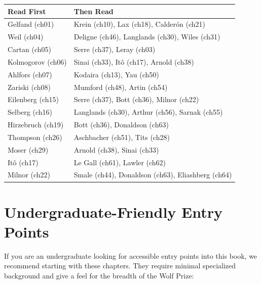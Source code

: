 \begin{center}
\begin{tabularx}{\linewidth}{|p{1.5cm}|>{\raggedright\arraybackslash}X|}
\hline
\textbf{Read First} & \textbf{Then Read} \\ \hline
Gelfand (ch01) & Krein (ch10), Lax (ch18), Calder\'on (ch21) \\ \hline
Weil (ch04) & Deligne (ch46), Langlands (ch30), Wiles (ch31) \\ \hline
Cartan (ch05) & Serre (ch37), Leray (ch03) \\ \hline
Kolmogorov (ch06) & Sinai (ch33), It\^o (ch17), Arnold (ch38) \\ \hline
Ahlfors (ch07) & Kodaira (ch13), Yau (ch50) \\ \hline
Zariski (ch08) & Mumford (ch48), Artin (ch54) \\ \hline
Eilenberg (ch15) & Serre (ch37), Bott (ch36), Milnor (ch22) \\ \hline
Selberg (ch16) & Langlands (ch30), Arthur (ch56), Sarnak (ch55) \\ \hline
Hirzebruch (ch19) & Bott (ch36), Donaldson (ch63) \\ \hline
Thompson (ch26) & Aschbacher (ch51), Tits (ch28) \\ \hline
Moser (ch29) & Arnold (ch38), Sinai (ch33) \\ \hline
It\^o (ch17) & Le Gall (ch61), Lawler (ch62) \\ \hline
Milnor (ch22) & Smale (ch44), Donaldson (ch63), Eliashberg (ch64) \\ \hline
\end{tabularx}
\end{center}

\section{Undergraduate-Friendly Entry Points}

If you are an undergraduate looking for accessible entry points into this book, we recommend starting with these chapters. They require minimal specialized background and give a feel for the breadth of the Wolf Prize:

